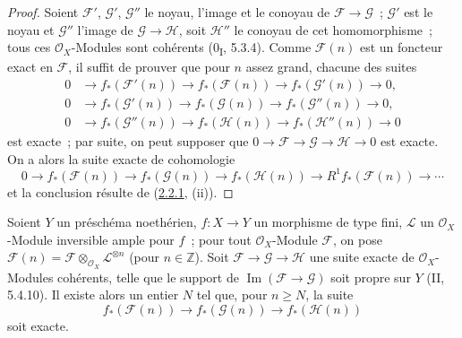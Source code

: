 \begin{proof}
Soient $\mathcal F'$, $\mathcal G'$, $\mathcal G''$ le noyau, l'image et
le conoyau de $\mathcal F\to\mathcal G$~; $\mathcal G'$ est le noyau et
$\mathcal G''$ l'image de $\mathcal G\to\mathcal H$, soit $\mathcal H''$
le conoyau de cet homomorphisme~; tous ces $\mathcal O_X$-Modules sont
cohérents (0\textsubscript{I}, 5.3.4). Comme $\mathcal F(n)$ est un
foncteur exact en $\mathcal F$, il suffit de prouver que pour $n$ assez
grand, chacune des suites
\begin{align*}
0&\longrightarrow f_*(\mathcal F'(n))
\longrightarrow f_*(\mathcal F(n))
\longrightarrow f_*(\mathcal G'(n))\longrightarrow0,\\
0&\longrightarrow f_*(\mathcal G'(n))
\longrightarrow f_*(\mathcal G(n))
\longrightarrow f_*(\mathcal G''(n))\longrightarrow0,\\
0&\longrightarrow f_*(\mathcal G''(n))
\longrightarrow f_*(\mathcal H(n))
\longrightarrow f_*(\mathcal H''(n))\longrightarrow0
\end{align*}
est exacte~; par suite, on peut supposer que
$0\to\mathcal F\to\mathcal G\to\mathcal H\to0$ est exacte. On a alors
la suite exacte de cohomologie
\[
0\longrightarrow f_*(\mathcal F(n))
\longrightarrow f_*(\mathcal G(n))
\longrightarrow f_*(\mathcal H(n))
\longrightarrow R^1f_*(\mathcal F(n))\longrightarrow\cdots
\]
et la conclusion résulte de (\hyperref[III.2.2.1-fr]{2.2.1}, (ii)).
\end{proof}

\begin{corollary}[2.2.4]
\label{III.2.2.4-fr}
Soient $Y$ un préschéma noethérien, $f:X\to Y$ un morphisme de type fini,
$\mathcal L$ un $\mathcal O_X$-Module inversible ample pour $f$~; pour
tout $\mathcal O_X$-Module $\mathcal F$, on pose
$\mathcal F(n)=\mathcal F\otimes_{\mathcal O_X}\mathcal L^{\otimes n}$
(pour $n\in\mathbb Z$). Soit
$\mathcal F\to\mathcal G\to\mathcal H$ une suite exacte de
$\mathcal O_X$-Modules cohérents, telle que le support de
$\operatorname{Im}(\mathcal F\to\mathcal G)$ soit propre sur $Y$ (II, 5.4.10). Il existe alors
un entier $N$ tel que, pour $n\geq N$, la suite
\[
f_*(\mathcal F(n))\longrightarrow f_*(\mathcal G(n))
\longrightarrow f_*(\mathcal H(n))
\]
soit exacte.
\end{corollary}

